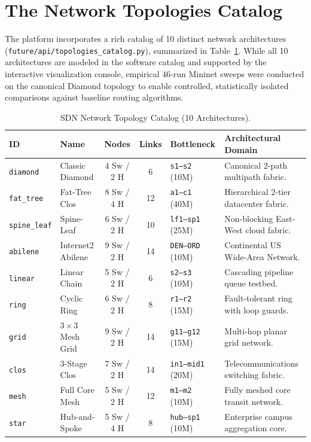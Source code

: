 \section{The Network Topologies Catalog}
The platform incorporates a rich catalog of 10 distinct network architectures (\texttt{future/api/topologies\_catalog.py}), summarized in Table~\ref{tab:topology_summary_ch2}. While all 10 architectures are modeled in the software catalog and supported by the interactive visualization console, empirical 46-run Mininet sweeps were conducted on the canonical Diamond topology to enable controlled, statistically isolated comparisons against baseline routing algorithms.

\begin{table}[H]
  \centering
  \small
  \caption{SDN Network Topology Catalog (10 Architectures).}
  \label{tab:topology_summary_ch2}
  \begin{tabularx}{\textwidth}{l l c c p{2.2cm} X}
    \toprule
    \textbf{ID} & \textbf{Name} & \textbf{Nodes} & \textbf{Links} & \textbf{Bottleneck} & \textbf{Architectural Domain} \\
    \midrule
    \texttt{diamond} & Classic Diamond & 4 Sw / 2 H & 6 & \texttt{s1--s2} (10M) & Canonical 2-path multipath fabric. \\
    \texttt{fat\_tree} & Fat-Tree Clos & 8 Sw / 4 H & 12 & \texttt{a1--c1} (40M) & Hierarchical 2-tier datacenter fabric. \\
    \texttt{spine\_leaf} & Spine-Leaf & 6 Sw / 2 H & 10 & \texttt{lf1--sp1} (25M) & Non-blocking East-West cloud fabric. \\
    \texttt{abilene} & Internet2 Abilene \cite{tipper2009internet2} & 9 Sw / 2 H & 14 & \texttt{DEN--ORD} (10M) & Continental US Wide-Area Network. \\
    \texttt{linear} & Linear Chain & 5 Sw / 2 H & 6 & \texttt{s2--s3} (10M) & Cascading pipeline queue testbed. \\
    \texttt{ring} & Cyclic Ring & 6 Sw / 2 H & 8 & \texttt{r1--r2} (15M) & Fault-tolerant ring with loop guards. \\
    \texttt{grid} & $3 \times 3$ Mesh Grid & 9 Sw / 2 H & 14 & \texttt{g11--g12} (15M) & Multi-hop planar grid network. \\
    \texttt{clos} & 3-Stage Clos & 7 Sw / 2 H & 14 & \texttt{in1--mid1} (20M) & Telecommunications switching fabric. \\
    \texttt{mesh} & Full Core Mesh & 5 Sw / 2 H & 12 & \texttt{m1--m2} (10M) & Fully meshed core transit network. \\
    \texttt{star} & Hub-and-Spoke & 5 Sw / 4 H & 8 & \texttt{hub--sp1} (10M) & Enterprise campus aggregation core. \\
    \bottomrule
  \end{tabularx}
\end{table}

